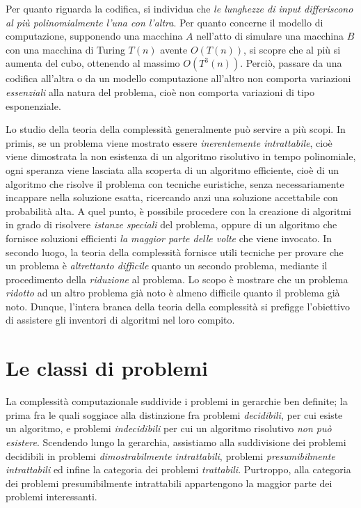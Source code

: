 \documentclass[10pt]{\classname}
\theoremstyle{newlinethm}
\theoremstyle{theorem}
\theoremstyle{definition}
\theoremstyle{definition}
\theoremstyle{definition}
\theoremstyle{definition}
\begin{document}
Per quanto riguarda la codifica, si individua che \emph{le lunghezze di input differiscono al più polinomialmente l'una con l'altra}. Per quanto concerne il modello di computazione, supponendo una macchina $A$ nell'atto di simulare una macchina $B$ con una macchina di Turing $T(n)$ avente $O(T(n))$, si scopre che al più si aumenta del cubo, ottenendo al massimo $O(T^3(n))$. Perciò, passare da una codifica all'altra o da un modello computazione all'altro non comporta variazioni \emph{essenziali} alla natura del problema, cioè non comporta variazioni di tipo esponenziale.

Lo studio della teoria della complessità generalmente può servire a più scopi. In primis, se un problema viene mostrato essere \emph{inerentemente intrattabile}, cioè viene dimostrata la non esistenza di un algoritmo risolutivo in tempo polinomiale, ogni speranza viene lasciata alla scoperta di un algoritmo efficiente, cioè di un algoritmo che risolve il problema con tecniche euristiche, senza necessariamente incappare nella soluzione esatta, ricercando anzi una soluzione accettabile con probabilità alta. A quel punto, è possibile procedere con la creazione di algoritmi in grado di risolvere \emph{istanze speciali} del problema, oppure di un algoritmo che fornisce soluzioni efficienti \emph{la maggior parte delle volte} che viene invocato. In secondo luogo, la teoria della complessità fornisce utili tecniche per provare che un problema è \emph{altrettanto difficile} quanto un secondo problema, mediante il procedimento della \emph{riduzione} al problema. Lo scopo è mostrare che un problema \emph{ridotto} ad un altro problema già noto è almeno difficile quanto il problema già noto. Dunque, l'intera branca della teoria della complessità si prefigge l'obiettivo di assistere gli inventori di algoritmi nel loro compito.

\section{Le classi di problemi}

La complessità computazionale suddivide i problemi in gerarchie ben definite; la prima fra le quali soggiace alla distinzione fra problemi \emph{decidibili}, per cui esiste un algoritmo, e problemi \emph{indecidibili} per cui un algoritmo risolutivo \emph{non può esistere}. Scendendo lungo la gerarchia, assistiamo alla suddivisione dei problemi decidibili in problemi \emph{dimostrabilmente intrattabili}, problemi \emph{presumibilmente intrattabili} ed infine la categoria dei problemi \emph{trattabili}. Purtroppo, alla categoria dei problemi presumibilmente intrattabili appartengono la maggior parte dei problemi interessanti.
\end{document}
